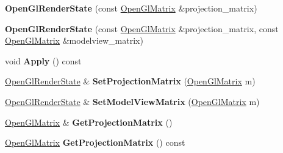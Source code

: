 \begin{DoxyCompactItemize}
\item 
{\bfseries Open\+Gl\+Render\+State} (const \hyperlink{structpangolin_1_1_open_gl_matrix}{Open\+Gl\+Matrix} \&projection\+\_\+matrix)\hypertarget{classpangolin_1_1_open_gl_render_state_a9a6d5a0d832f71c3a0cacf8b1f98f10c}{}\label{classpangolin_1_1_open_gl_render_state_a9a6d5a0d832f71c3a0cacf8b1f98f10c}

\item 
{\bfseries Open\+Gl\+Render\+State} (const \hyperlink{structpangolin_1_1_open_gl_matrix}{Open\+Gl\+Matrix} \&projection\+\_\+matrix, const \hyperlink{structpangolin_1_1_open_gl_matrix}{Open\+Gl\+Matrix} \&modelview\+\_\+matrix)\hypertarget{classpangolin_1_1_open_gl_render_state_a1ea8c688ba74cc12274db0e42ad2a1dc}{}\label{classpangolin_1_1_open_gl_render_state_a1ea8c688ba74cc12274db0e42ad2a1dc}

\item 
void {\bfseries Apply} () const \hypertarget{classpangolin_1_1_open_gl_render_state_abeafc0453a8fee229ae7458fbae5fa8d}{}\label{classpangolin_1_1_open_gl_render_state_abeafc0453a8fee229ae7458fbae5fa8d}

\item 
\hyperlink{classpangolin_1_1_open_gl_render_state}{Open\+Gl\+Render\+State} \& {\bfseries Set\+Projection\+Matrix} (\hyperlink{structpangolin_1_1_open_gl_matrix}{Open\+Gl\+Matrix} m)\hypertarget{classpangolin_1_1_open_gl_render_state_a10bed2e6d03df9a71edaef67b18d2e4e}{}\label{classpangolin_1_1_open_gl_render_state_a10bed2e6d03df9a71edaef67b18d2e4e}

\item 
\hyperlink{classpangolin_1_1_open_gl_render_state}{Open\+Gl\+Render\+State} \& {\bfseries Set\+Model\+View\+Matrix} (\hyperlink{structpangolin_1_1_open_gl_matrix}{Open\+Gl\+Matrix} m)\hypertarget{classpangolin_1_1_open_gl_render_state_aa14a8fc9e32b2a4279a1b41a4dd6ae97}{}\label{classpangolin_1_1_open_gl_render_state_aa14a8fc9e32b2a4279a1b41a4dd6ae97}

\item 
\hyperlink{structpangolin_1_1_open_gl_matrix}{Open\+Gl\+Matrix} \& {\bfseries Get\+Projection\+Matrix} ()\hypertarget{classpangolin_1_1_open_gl_render_state_a60ecce8b8ede066ced4e3fd79f970d71}{}\label{classpangolin_1_1_open_gl_render_state_a60ecce8b8ede066ced4e3fd79f970d71}

\item 
\hyperlink{structpangolin_1_1_open_gl_matrix}{Open\+Gl\+Matrix} {\bfseries Get\+Projection\+Matrix} () const \hypertarget{classpangolin_1_1_open_gl_render_state_a6e14326a7dabac34f1a2f943b919305a}{}\label{classpangolin_1_1_open_gl_render_state_a6e14326a7dabac34f1a2f943b919305a}


\end{DoxyCompactItemize}
